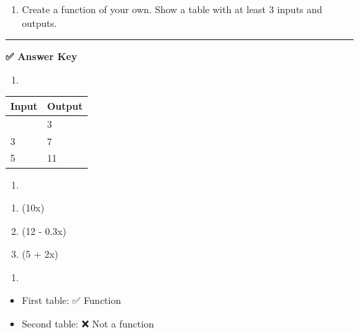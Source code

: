 \documentclass[
  letterpaper,
  DIV=11,
  numbers=noendperiod]{scrreprt}
\providecommand{\tightlist}{%
  \setlength{\itemsep}{0pt}\setlength{\parskip}{0pt}}
\begin{document}
\begin{enumerate}
\def\labelenumi{\arabic{enumi}.}
\setcounter{enumi}{3}
\tightlist
\item
  Create a function of your own. Show a table with at least 3 inputs and
  outputs.
\end{enumerate}

\begin{center}\rule{0.5\linewidth}{0.5pt}\end{center}

\textbf{✅ Answer Key}

\begin{enumerate}
\def\labelenumi{\arabic{enumi}.}
\tightlist
\item
\end{enumerate}

\begin{longtable}[]{@{}ll@{}}
\toprule\noalign{}
Input & Output \\
\midrule\noalign{}
\endhead
\bottomrule\noalign{}
\endlastfoot
1 & 3 \\
3 & 7 \\
5 & 11 \\
\end{longtable}

\begin{enumerate}
\def\labelenumi{\arabic{enumi}.}
\setcounter{enumi}{1}
\tightlist
\item
\end{enumerate}

\begin{enumerate}
\def\labelenumi{\alph{enumi}.}
\tightlist
\item
  (10x)\\
\item
  (12 - 0.3x)\\
\item
  (5 + 2x)
\end{enumerate}

\begin{enumerate}
\def\labelenumi{\arabic{enumi}.}
\setcounter{enumi}{2}
\tightlist
\item
\end{enumerate}

\begin{itemize}
\tightlist
\item
  First table: ✅ Function\\
\item
  Second table: ❌ Not a function
\end{itemize}
\end{document}
